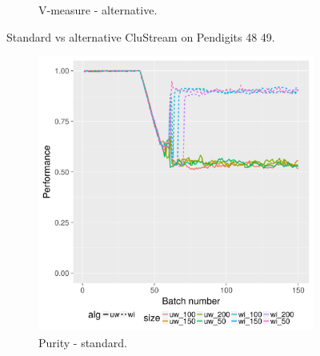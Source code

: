 \begin{figure}[H]
\begin{subfigure}[b]{0.47\textwidth}
                \caption{V-measure - alternative.}
                \label{fig:va_4849}
        \end{subfigure}
\caption{Standard vs alternative CluStream on Pendigits 48 49.}
\label{fig:standard_alternative_4849}
\end{figure}

\begin{figure}[H]
        \centering
        \begin{subfigure}[b]{0.47\textwidth}
          \includegraphics[width=\textwidth]{standard_alt/evolving_pen_34_37_standard_purity.png}         
                 \caption{Purity - standard.}
                 \label{fig:ps_3437}
        \end{subfigure}
        \begin{subfigure}[b]{0.47\textwidth}

\end{subfigure}
\end{figure}
